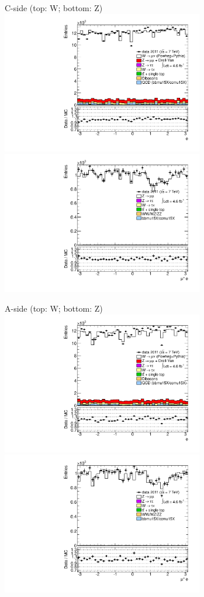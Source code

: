 {

\colb[T]

C-side (top: W; bottom: Z)
\centering
\includegraphics[width=0.66\textwidth]{dates/20130306/figures/etaphi/W_9_C_stack_l_phi_POS} \\
\includegraphics[width=0.66\textwidth]{dates/20130306/figures/etaphi/Z_9_C_stack_lP_phi_ALL.pdf}

A-side (top: W; bottom: Z)
\centering
\includegraphics[width=0.66\textwidth]{dates/20130306/figures/etaphi/W_9_A_stack_l_phi_POS} \\
\includegraphics[width=0.66\textwidth]{dates/20130306/figures/etaphi/Z_9_A_stack_lP_phi_ALL.pdf} 

\cole
}


